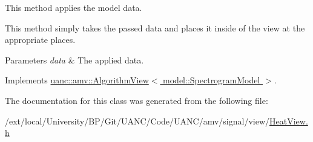 This method applies the model data. 

This method simply takes the passed data and places it inside of the view at the appropriate places.


\begin{DoxyParams}{Parameters}
{\em data} & The applied data. \\
\hline
\end{DoxyParams}


Implements \hyperlink{classuanc_1_1amv_1_1_algorithm_view_ad656cf5223a66a942441ee39f44f65a3}{uanc\+::amv\+::\+Algorithm\+View$<$ model\+::\+Spectrogram\+Model $>$}.



The documentation for this class was generated from the following file\+:\begin{DoxyCompactItemize}
\item 
/ext/local/\+University/\+B\+P/\+Git/\+U\+A\+N\+C/\+Code/\+U\+A\+N\+C/amv/signal/view/\hyperlink{_heat_view_8h}{Heat\+View.\+h}\end{DoxyCompactItemize}
